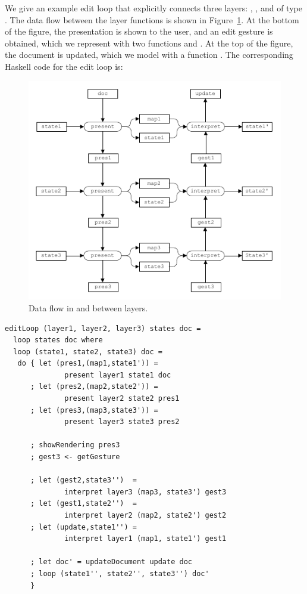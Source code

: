\documentclass[preprint,natbib]{sigplanconf}
\begin{document}
We give an example edit loop that explicitly connects three layers: , , and  of type . The data flow between the layer functions is shown in Figure~\ref{explicit}. At the bottom of the figure, the presentation is shown to the user, and an edit gesture is obtained, which we represent with two functions  and . At the top of the figure, the document is updated, which we model with a function . The corresponding Haskell code for the edit loop is:


\begin{figure}
\includegraphics[width=\columnwidth]{images/LayersDataFlow}
\caption{Data flow in and between layers.} \label{explicit} 
\end{figure}

\begin{small}
\begin{verbatim}
editLoop (layer1, layer2, layer3) states doc = 
  loop states doc where
  loop (state1, state2, state3) doc = 
   do { let (pres1,(map1,state1')) = 
              present layer1 state1 doc
      ; let (pres2,(map2,state2')) = 
              present layer2 state2 pres1
      ; let (pres3,(map3,state3')) = 
              present layer3 state3 pres2

      ; showRendering pres3
      ; gest3 <- getGesture

      ; let (gest2,state3'')  = 
              interpret layer3 (map3, state3') gest3
      ; let (gest1,state2'')  =
              interpret layer2 (map2, state2') gest2
      ; let (update,state1'') = 
              interpret layer1 (map1, state1') gest1
      
      ; let doc' = updateDocument update doc
      ; loop (state1'', state2'', state3'') doc'
      }
\end{verbatim}
\end{small}
\end{document}
